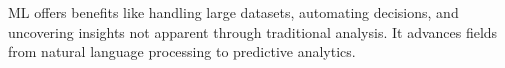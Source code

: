 ML offers benefits like handling large datasets, automating decisions, and uncovering insights not apparent through traditional analysis. It advances fields from natural language processing to predictive analytics.
